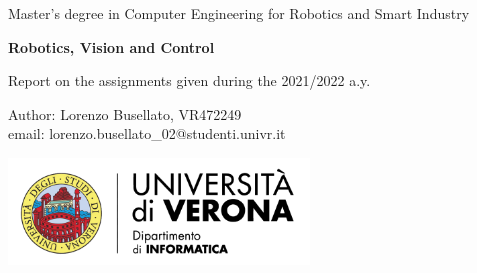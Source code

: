\documentclass{article}
\theoremstyle{break}
\numberwithin{equation}{section}
\newcommand\blankpage{%
    \null
    \thispagestyle{empty}%
    \addtocounter{page}{-1}%
    \newpage}
\begin{document}
\afterpage{\blankpage}
\begin{titlepage}
\begin{center}
\huge Master's degree in Computer Engineering for Robotics and Smart Industry
\end{center}
\vspace*{\fill}
\begin{center}
\textbf{\Huge Robotics, Vision and Control}
\end{center}
\begin{center}
Report on the assignments given during the 2021/2022 a.y.
\end{center}
\vspace*{\fill}
\begin{center}
\begin{minipage}{0.4\textwidth}
\begin{flushleft}
Author: Lorenzo Busellato, VR472249\\
email: lorenzo.busellato\_02@studenti.univr.it
\end{flushleft}
\end{minipage}
\begin{minipage}{0.5\textwidth}
\begin{flushright}
\includegraphics[keepaspectratio,width=0.6\textwidth]{logo}
\end{flushright}
\end{minipage}

\end{center}
\vspace{1cm}
\end{titlepage}


\afterpage{\blankpage}
\thispagestyle{empty}
\setcounter{page}{0}
\renewcommand{\cftsecleader}{\cftdotfill{\cftdotsep}}
\setcounter{tocdepth}{2}
\tableofcontents
\clearpage

\fancyhead[R]{}
\fancyhead[L]{}
\pagestyle{fancy}

















\end{document}
